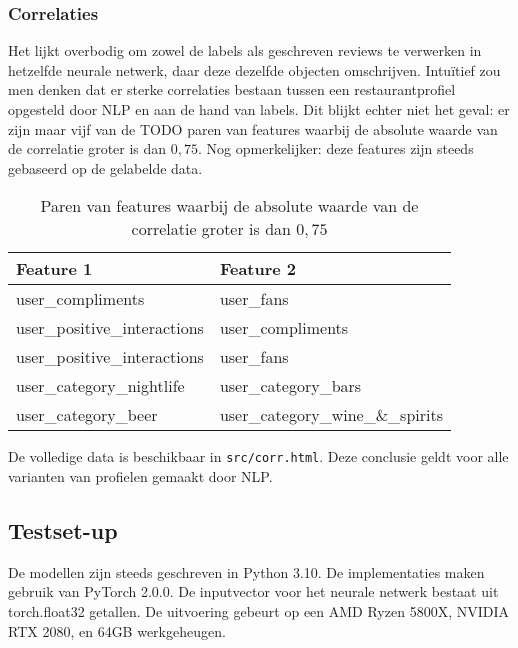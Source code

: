 \subsubsection{Correlaties}
Het lijkt overbodig om zowel de labels als geschreven reviews te verwerken in hetzelfde neurale netwerk, daar deze dezelfde objecten omschrijven. Intuïtief zou men denken dat er sterke correlaties bestaan tussen een restaurantprofiel opgesteld door NLP en aan de hand van labels. Dit blijkt echter niet het geval: er zijn maar vijf  van de TODO paren van features waarbij de absolute waarde van de correlatie groter is dan $0,75$. Nog opmerkelijker: deze features zijn steeds gebaseerd op de gelabelde data.


\begin{table}[H]
    \centering
    \begin{tabular}{l|l}
    Feature 1 & Feature 2 \\ \hline
    user\_compliments & user\_fans \\
    user\_positive\_interactions & user\_compliments \\
    user\_positive\_interactions & user\_fans \\
    user\_category\_nightlife & user\_category\_bars \\
    user\_category\_beer & user\_category\_wine\_\&\_spirits
    \end{tabular}
    \caption{Paren van features waarbij de absolute waarde van de correlatie groter is dan $0,75$}
    \label{}
\end{table}

De volledige data is beschikbaar in \verb|src/corr.html|. Deze conclusie geldt voor alle varianten van profielen gemaakt door NLP.

\subsection{Testset-up}
De modellen zijn steeds geschreven in Python 3.10. De implementaties maken gebruik van PyTorch 2.0.0. \cite{pytorch} De inputvector voor het neurale netwerk bestaat uit \verb||torch.float32 getallen. De uitvoering gebeurt op een AMD Ryzen 5800X, NVIDIA RTX 2080, en 64GB werkgeheugen. %

